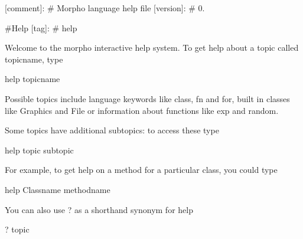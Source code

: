 \mbox{[}comment\mbox{]}\+: \# Morpho language help file \mbox{[}version\mbox{]}\+: \# 0.

\#\+Help \mbox{[}tag\mbox{]}\+: \# help

Welcome to the morpho interactive help system. To get help about a topic called {\ttfamily topicname}, type \begin{DoxyVerb}help topicname
\end{DoxyVerb}


Possible topics include language keywords like {\ttfamily class}, {\ttfamily fn} and {\ttfamily for}, built in classes like {\ttfamily Graphics} and {\ttfamily File} or information about functions like {\ttfamily exp} and {\ttfamily random}.

Some topics have additional subtopics\+: to access these type \begin{DoxyVerb}help topic subtopic
\end{DoxyVerb}


For example, to get help on a method for a particular class, you could type \begin{DoxyVerb}help Classname methodname
\end{DoxyVerb}


You can also use {\ttfamily ?} as a shorthand synonym for {\ttfamily help} \begin{DoxyVerb}? topic
\end{DoxyVerb}
 